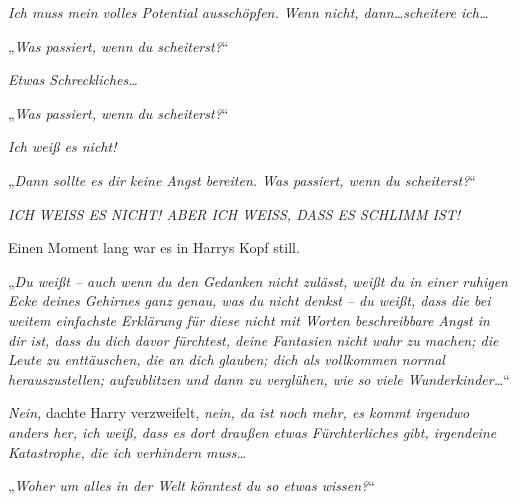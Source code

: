 \emph{Ich muss mein volles Potential ausschöpfen. Wenn nicht, dann…scheitere ich…}

„\emph{Was passiert, wenn du scheiterst?}“

\emph{Etwas Schreckliches…}

„\emph{Was passiert, wenn du scheiterst?}“

\emph{Ich weiß es nicht! }

„\emph{Dann sollte es dir keine Angst bereiten. Was passiert, wenn du scheiterst?}“

\emph{ICH WEISS ES NICHT! ABER ICH WEISS, DASS ES SCHLIMM IST!}

Einen Moment lang war es in Harrys Kopf still.

„\emph{Du weißt – auch wenn du den Gedanken nicht zulässt, weißt du in einer ruhigen Ecke deines Gehirnes ganz genau, was du nicht denkst – du \emph{weißt}, dass die bei weitem einfachste Erklärung für diese nicht mit Worten beschreibbare Angst in dir ist, dass du dich davor fürchtest, deine Fantasien nicht wahr zu machen; die Leute zu enttäuschen, die an dich glauben; dich als vollkommen normal herauszustellen; aufzublitzen und dann zu verglühen, wie so viele Wunderkinder…}“

\emph{Nein,} dachte Harry verzweifelt, \emph{nein, da ist noch mehr, es kommt irgendwo anders her, ich weiß, dass es dort draußen etwas Fürchterliches gibt, irgendeine Katastrophe, die ich verhindern muss…}

„\emph{Woher um alles in der Welt könntest du so etwas wissen?}“

